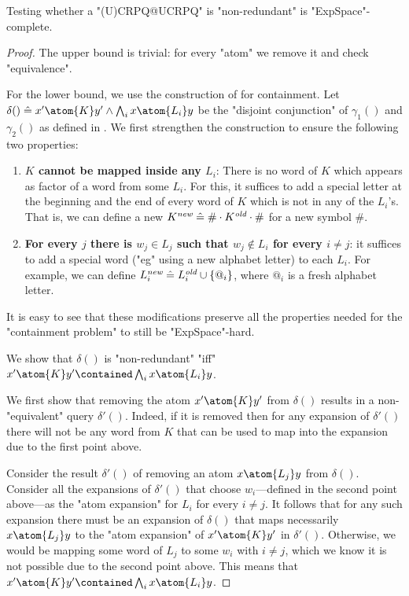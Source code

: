 \begin{proposition}
	\AP\label{prop:lowerbound-non-redundant}
	Testing whether a "(U)CRPQ@UCRPQ" is "non-redundant" is "ExpSpace"-complete.
\end{proposition}

\begin{proof}
	The upper bound is trivial: for every "atom" we remove it and check "equivalence".
	
	For the lower bound, we use the construction of  for containment. Let $\delta() 
	\defeq x' \atom{K} y' \land \bigwedge_i x \atom{L_i} y$ be the "disjoint conjunction" of $\gamma_1()$ and $\gamma_2()$ as defined in .
	We first strengthen the construction to ensure the following two properties:
	\begin{enumerate}
		\item \textbf{$K$ cannot be mapped inside any $L_i$}: There is no word of $K$ which appears as factor of a word from some $L_i$. For this, it suffices to add a special letter at the beginning and the end of every word of $K$ which is not in any of the $L_i$'s. That is, we can define a new $K^{\textit{new}} \mathrel{\hat{=}} \# \cdot K^{\textit{old}} \cdot \#$ for a new symbol $\#$.
		\item \textbf{For every $j$ there is $w_j \in L_j$ such that $w_j \not\in L_i$ for every $i \neq j$}: it suffices to add a special word ("eg" using a new alphabet letter) to each $L_i$. For example, we can define $L_{i}^{\textit{new}} \mathrel{\hat{=}} L_{i}^\textit{old} \cup \{@_i\}$, where $@_i$ is a fresh alphabet letter.
	\end{enumerate}
	It is easy to see that these modifications preserve all the properties needed for the "containment problem" to still be "ExpSpace"-hard.
	
	We show that $\delta()$ is "non-redundant" "iff" $x' \atom{K} y' \contained \bigwedge_i x \atom{L_i} y$.
	
	 We first show that removing the atom $x' \atom{K} y'$ from $\delta()$ results in a non-"equivalent" query $\delta'()$. Indeed, if it is removed then for any expansion of $\delta'()$ there will not be any word from $K$ that can be used to map into the expansion due to the first point above.

	 Consider the result $\delta'()$ of removing an atom $x \atom{L_j} y$ from $\delta()$. Consider all the expansions of $\delta'()$ that choose $w_i$---defined in the second point above---as the "atom expansion" for $L_i$ for every $i \neq j$. It follows that for any such expansion there must be an expansion of $\delta()$ that maps necessarily $x \atom{L_j} y$ to the "atom expansion" of $x' \atom{K} y'$ in $\delta'()$. Otherwise, we would be mapping some word of $L_j$ to some $w_i$ with $i\neq j$, which we know it is not possible due to the second point above.
	This means that $x' \atom{K} y' \contained \bigwedge_i x \atom{L_i} y$.


\end{proof}
